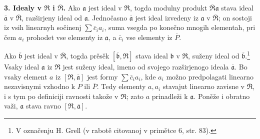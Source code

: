 \documentclass[11pt]{article}
\begin{document}
\setcounter{footnote}{14}

\textbf{3. Idealy v $\mathfrak R$ i $\overline{\mathfrak R}$.} Ako $\mathfrak a$ jest ideal v $\mathfrak R$, togda modulny produkt $\overline{\mathfrak R}\mathfrak a$ stava ideal $\overline{\mathfrak a}$ v $\overline{\mathfrak R}$, razširjeny ideal od $\mathfrak a$. Jednočasno $\overline{\mathfrak a}$ jest ideal izvedeny iz $\mathfrak a$ v $\overline{\mathfrak R}$; on sostoji iz vsih linearnyh sočinenj $\sum \bar c_i a_i$, suma vsegda po konečno mnogih elementah, pri čem $a_i$ prohodet vse elementy iz $\mathfrak a$, a $\bar c_i$ vse elementy iz $\overline P$.

Ako $\overline{\mathfrak b}$ jest ideal v $\overline{\mathfrak R}$, togda prěsěk $[\overline{\mathfrak b},\mathfrak R]$ stava ideal $\mathfrak b$ v $\mathfrak R$, suženy ideal od $\overline{\mathfrak b}$.\footnote{V označenju H. Grell (v rabotě citovanoj v primětce 6, str. 83).} Vsaky ideal $\mathfrak a$ iz $\mathfrak R$ jest suženy ideal, imeno od svojego razširjenogo ideala $\overline{\mathfrak a}$. Bo vsaky element $a$ iz $[\mathfrak R,\overline{\mathfrak a}]$ jest formy $\sum \bar c_i a_i$, kde $a_i$ možno predpolagati linearno nezavisnymi vzhodno k $P$ ili $\overline P$. Tedy elementy $a,a_i$ stavajut linearno zavisne v $\overline{\mathfrak R}$, i s tym po definiciji ravnosti takože v $\mathfrak R$; zato $a$ prinadleži k $\mathfrak a$. Poněže i obratno važi, $\mathfrak a$ stava ravno $[\mathfrak R,\overline{\mathfrak a}]$.
\end{document}

